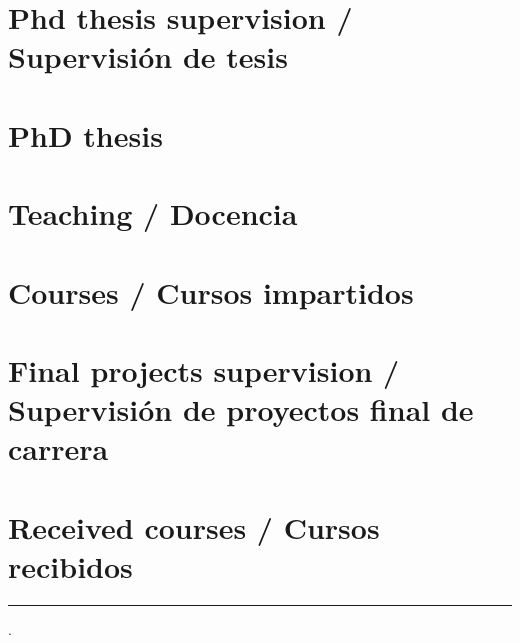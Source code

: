 \documentclass{article}
\begin{document}
\renewcommand{\refname}{}
\section{Phd thesis supervision / Supervisión de tesis}


\section{PhD thesis}


\section{Teaching / Docencia}


\renewcommand{\refname}{}
\section{Courses / Cursos impartidos}


\renewcommand{\refname}{}
\section{Final projects supervision / Supervisión de proyectos final de carrera}


\renewcommand{\refname}{}
\section{Received courses / Cursos recibidos}


\hrule
\currenttime.
\end{document}
